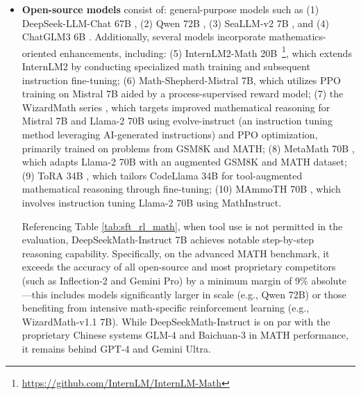 \begin{itemize}[topsep=0pt]
\begin{itemize}[topsep=0pt]
    \item \textbf{Closed-source models} encompass: (1) models from the GPT series, including GPT-4 \citep{gpt4} and its Code Interpreter variant~\footnote{\url{https://openai.com/blog/chatgpt-plugins\#\#code-interpreter}}, (2) Gemini Ultra and Pro \citep{gemini}, (3) Inflection-2 \citep{inflection-2}, (4) Grok-1~\footnote{\url{https://x.ai/model-card}}, and (5) recent entrants from Chinese developers such as Baichuan-3~\footnote{\url{https://www.baichuan-ai.com}}, and (6) the newest GLM-4~\footnote{\url{https://open.bigmodel.cn/dev/api\#glm-4}} from the GLM model line \citep{glm}.
\end{itemize}

These models are intended for broad applicability, with most having undergone various alignment processes.

\item \textbf{Open-source models} consist of: general-purpose models such as (1) DeepSeek-LLM-Chat 67B \citep{deepseek-llm}, (2) Qwen 72B \citep{qwen}, (3) SeaLLM-v2 7B \citep{seallm}, and (4) ChatGLM3 6B \citep{chatglm3}. Additionally, several models incorporate mathematics-oriented enhancements, including: (5) InternLM2-Math 20B~\footnote{\url{https://github.com/InternLM/InternLM-Math}}, which extends InternLM2 by conducting specialized math training and subsequent instruction fine-tuning; (6) Math-Shepherd-Mistral 7B, which utilizes PPO training \citep{schulman2017proximal} on Mistral 7B \citep{mistral} aided by a process-supervised reward model; (7) the WizardMath series \citep{wizardmath}, which targets improved mathematical reasoning for Mistral 7B and Llama-2 70B \citep{llama2} using evolve-instruct (an instruction tuning method leveraging AI-generated instructions) and PPO optimization, primarily trained on problems from GSM8K and MATH; (8) MetaMath 70B \citep{metamath}, which adapts Llama-2 70B with an augmented GSM8K and MATH dataset; (9) ToRA 34B \cite{tora}, which tailors CodeLlama 34B for tool-augmented mathematical reasoning through fine-tuning; (10) MAmmoTH 70B \citep{MathInstruct}, which involves instruction tuning Llama-2 70B using MathInstruct.

Referencing Table \ref{tab:sft_rl_math}, when tool use is not permitted in the evaluation, DeepSeekMath-Instruct 7B achieves notable step-by-step reasoning capability. Specifically, on the advanced MATH benchmark, it exceeds the accuracy of all open-source and most proprietary competitors (such as Inflection-2 and Gemini Pro) by a minimum margin of 9\% absolute—this includes models significantly larger in scale (e.g., Qwen 72B) or those benefiting from intensive math-specific reinforcement learning (e.g., WizardMath-v1.1 7B). While DeepSeekMath-Instruct is on par with the proprietary Chinese systems GLM-4 and Baichuan-3 in MATH performance, it remains behind GPT-4 and Gemini Ultra.


\end{itemize}
